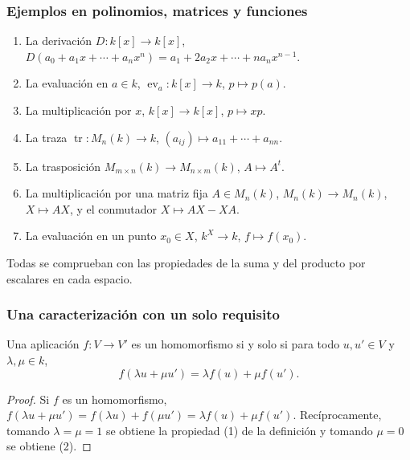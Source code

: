 \begin{frame}
    \frametitle{Ejemplos en polinomios, matrices y funciones}

    \begin{example}
        \begin{enumerate}
            \item La \alert{derivación}
            $D\colon k[x]\to k[x]$, $D(a_0+a_1x+\cdots+a_nx^n)
            =a_1+2a_2x+\cdots+na_nx^{n-1}$.
            \item La \alert{evaluación} en $a\in k$,
            $\operatorname{ev}_a\colon k[x]\to k$, $p\mapsto p(a)$.
            \item La \alert{multiplicación} por $x$,
            $k[x]\to k[x]$, $p\mapsto xp$.
            \item La \alert{traza} $\operatorname{tr}\colon M_n(k)\to k$,
            $(a_{ij})\mapsto a_{11}+\cdots+a_{nn}$.
            \item La \alert{trasposición}
            $M_{m\times n}(k)\to M_{n\times m}(k)$, $A\mapsto A^t$.
            \item La \alert{multiplicación} por una matriz fija $A\in M_n(k)$,
            $M_n(k)\to M_n(k)$, $X\mapsto AX$, y el \alert{conmutador}
            $X\mapsto AX-XA$.
            \item La \alert{evaluación} en un punto $x_0\in X$,
            $k^X\to k$, $f\mapsto f(x_0)$.
        \end{enumerate}
    \end{example}

    Todas se comprueban con las propiedades de la suma y del producto por
    escalares en cada espacio.
\end{frame}


\begin{frame}
    \frametitle{Una caracterización con un solo requisito}

    \begin{proposition}
        Una aplicación $f\colon V\to V'$ es un homomorfismo si y solo si
        para todo $u,u'\in V$ y $\lambda,\mu\in k$,
        \[
            f(\lambda u+\mu u')=\lambda f(u)+\mu f(u').
        \]
    \end{proposition}

    \begin{proof}
        Si $f$ es un homomorfismo,
        $f(\lambda u+\mu u')=f(\lambda u)+f(\mu u')=\lambda f(u)+\mu f(u')$.
        Recíprocamente, tomando $\lambda=\mu=1$ se obtiene la propiedad (1) de la definición y tomando
        $\mu=0$ se obtiene (2).
    \end{proof}
\end{frame}


